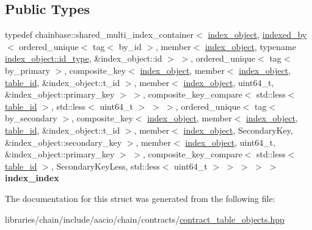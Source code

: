 \subsection*{Public Types}
\begin{DoxyCompactItemize}
\item 
\mbox{\label{structaacio_1_1chain_1_1contracts_1_1secondary__index_a220ab06c3c7cb9ebf941871934b833ea}} 
typedef chainbase\+::shared\+\_\+multi\+\_\+index\+\_\+container$<$ \mbox{\hyperlink{structaacio_1_1chain_1_1contracts_1_1secondary__index_1_1index__object}{index\+\_\+object}}, \mbox{\hyperlink{structaacio_1_1indexed__by}{indexed\+\_\+by}}$<$ ordered\+\_\+unique$<$ tag$<$ by\+\_\+id $>$, member$<$ \mbox{\hyperlink{structaacio_1_1chain_1_1contracts_1_1secondary__index_1_1index__object}{index\+\_\+object}}, typename \mbox{\hyperlink{classchainbase_1_1oid}{index\+\_\+object\+::id\+\_\+type}}, \&index\+\_\+object\+::id $>$ $>$, ordered\+\_\+unique$<$ tag$<$ by\+\_\+primary $>$, composite\+\_\+key$<$ \mbox{\hyperlink{structaacio_1_1chain_1_1contracts_1_1secondary__index_1_1index__object}{index\+\_\+object}}, member$<$ \mbox{\hyperlink{structaacio_1_1chain_1_1contracts_1_1secondary__index_1_1index__object}{index\+\_\+object}}, \mbox{\hyperlink{classchainbase_1_1oid}{table\+\_\+id}}, \&index\+\_\+object\+::t\+\_\+id $>$, member$<$ \mbox{\hyperlink{structaacio_1_1chain_1_1contracts_1_1secondary__index_1_1index__object}{index\+\_\+object}}, uint64\+\_\+t, \&index\+\_\+object\+::primary\+\_\+key $>$ $>$, composite\+\_\+key\+\_\+compare$<$ std\+::less$<$ \mbox{\hyperlink{classchainbase_1_1oid}{table\+\_\+id}} $>$, std\+::less$<$ uint64\+\_\+t $>$ $>$ $>$, ordered\+\_\+unique$<$ tag$<$ by\+\_\+secondary $>$, composite\+\_\+key$<$ \mbox{\hyperlink{structaacio_1_1chain_1_1contracts_1_1secondary__index_1_1index__object}{index\+\_\+object}}, member$<$ \mbox{\hyperlink{structaacio_1_1chain_1_1contracts_1_1secondary__index_1_1index__object}{index\+\_\+object}}, \mbox{\hyperlink{classchainbase_1_1oid}{table\+\_\+id}}, \&index\+\_\+object\+::t\+\_\+id $>$, member$<$ \mbox{\hyperlink{structaacio_1_1chain_1_1contracts_1_1secondary__index_1_1index__object}{index\+\_\+object}}, Secondary\+Key, \&index\+\_\+object\+::secondary\+\_\+key $>$, member$<$ \mbox{\hyperlink{structaacio_1_1chain_1_1contracts_1_1secondary__index_1_1index__object}{index\+\_\+object}}, uint64\+\_\+t, \&index\+\_\+object\+::primary\+\_\+key $>$ $>$, composite\+\_\+key\+\_\+compare$<$ std\+::less$<$ \mbox{\hyperlink{classchainbase_1_1oid}{table\+\_\+id}} $>$, Secondary\+Key\+Less, std\+::less$<$ uint64\+\_\+t $>$ $>$ $>$ $>$ $>$ {\bfseries index\+\_\+index}
\end{DoxyCompactItemize}


The documentation for this struct was generated from the following file\+:\begin{DoxyCompactItemize}
\item 
libraries/chain/include/aacio/chain/contracts/\mbox{\hyperlink{contract__table__objects_8hpp}{contract\+\_\+table\+\_\+objects.\+hpp}}\end{DoxyCompactItemize}
